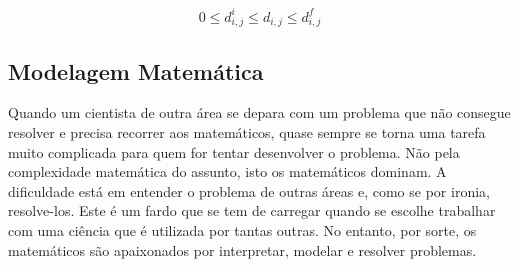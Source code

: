 \documentclass[a4paper,12pt]{article}
\begin{document}
	$$ 0 \leq d_{i,j}^i \leq d_{i,j} \leq d_{i,j}^f$$
	
	\subsection{Modelagem Matemática}
	Quando um cientista de outra área se depara com um problema que não consegue resolver e precisa recorrer aos matemáticos, quase sempre se torna uma tarefa muito complicada para quem for tentar desenvolver o problema. Não pela complexidade matemática do assunto, isto os matemáticos dominam. A dificuldade está em entender o problema de outras áreas e, como se por ironia, resolve-los. Este é um fardo que se tem de carregar quando se escolhe trabalhar com uma ciência que é utilizada por tantas outras. No entanto, por sorte, os matemáticos são apaixonados por interpretar, modelar e resolver problemas.
	
\end{document}
